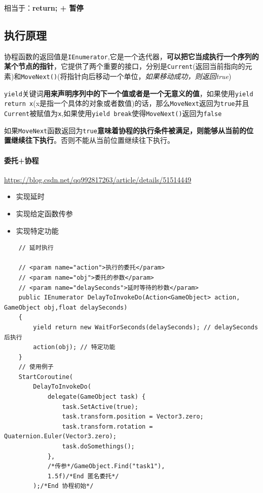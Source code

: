 \documentclass[UTF8,a4paper,12pt]{ctexbook}
\begin{document}
				\color{blue}相当于：\textbf{return; + 暂停}\color{black}
				
		\subsection{执行原理}
			协程函数的返回值是\verb|IEnumerator|,它是一个迭代器，\textbf{可以把它当成执行一个序列的某个节点的指针}，它提供了两个重要的接口，分别是\verb|Current|(返回当前指向的元素)和\verb|MoveNext()|(将指针向后移动一个单位，\textit{如果移动成功，则返回true})
			
			\verb|yield|关键词\textbf{用来声明序列中的下一个值或者是一个无意义的值}，如果使用\verb|yield return x|(x是指一个具体的对象或者数值)的话，那么\verb|MoveNext|返回为\verb|true|并且\verb|Current|被赋值为\verb|x|,如果使用\verb|yield break|使得\verb|MoveNext()|返回为\verb|false|
			
			如果\verb|MoveNext|函数返回为\verb|true|\textbf{意味着协程的执行条件被满足，则能够从当前的位置继续往下执行}。否则不能从当前位置继续往下执行。	

	\paragraph{委托+协程}
		\url{https://blog.csdn.net/qq992817263/article/details/51514449}
		
		\begin{itemize}
			\item 实现延时
			\item 实现给定函数传参
			\item 实现特定功能
		\end{itemize}
	
		\begin{lstlisting}
	// 延时执行

	// <param name="action">执行的委托</param>
	// <param name="obj">委托的参数</param>
	// <param name="delaySeconds">延时等待的秒数</param>
	public IEnumerator DelayToInvokeDo(Action<GameObject> action, GameObject obj,float delaySeconds)
	{
		yield return new WaitForSeconds(delaySeconds); // delaySeconds 后执行
		action(obj); // 特定功能
	}
	// 使用例子
	StartCoroutine(
		DelayToInvokeDo(
			delegate(GameObject task) {
				task.SetActive(true);
				task.transform.position = Vector3.zero;
				task.transform.rotation = Quaternion.Euler(Vector3.zero);
				task.doSomethings();
			},
			/*传参*/GameObject.Find("task1"),
			1.5f)/*End 匿名委托*/
		);/*End 协程初始*/
		\end{lstlisting}
		
\end{document}
